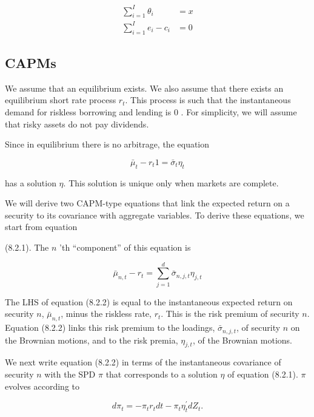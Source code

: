 \documentclass[\topdir/lecture\_notes.tex]{subfiles}
\begin{document}
\begin{equation}
\begin{aligned}
\sum_{i=1}^{I} \theta_{i} & =x \\
\sum_{i=1}^{I} e_{i}-c_{i} & =0
\end{aligned}
\end{equation}

\subsection{CAPMs}
We assume that an equilibrium exists. We also assume that there exists an equilibrium short rate process $r_{t}$. This process is such that the instantaneous demand for riskless borrowing and lending is 0 . For simplicity, we will assume that risky assets do not pay dividends.

Since in equilibrium there is no arbitrage, the equation

\begin{equation}
\bar{\mu}_{t}-r_{t} 1=\bar{\sigma}_{t} \eta_{t} \label{eq:8.2.1}
\end{equation}

has a solution $\eta$. This solution is unique only when markets are complete.

We will derive two CAPM-type equations that link the expected return on a security to its covariance with aggregate variables. To derive these equations, we start from equation

(8.2.1). The $n$ 'th ``component'' of this equation is

\begin{equation}
\bar{\mu}_{n, t}-r_{t}=\sum_{j=1}^{d} \bar{\sigma}_{n, j, t} \eta_{j, t} \label{eq:8.2.2}
\end{equation}

The LHS of equation (8.2.2) is equal to the instantaneous expected return on security $n$, $\bar{\mu}_{n, t}$, minus the riskless rate, $r_{t}$. This is the risk premium of security $n$. Equation (8.2.2) links this risk premium to the loadings, $\bar{\sigma}_{n, j, t}$, of security $n$ on the Brownian motions, and to the risk premia, $\eta_{j, t}$, of the Brownian motions.

We next write equation (8.2.2) in terms of the instantaneous covariance of security $n$ with the SPD $\pi$ that corresponds to a solution $\eta$ of equation (8.2.1). $\pi$ evolves according to

\begin{equation}
d \pi_{t}=-\pi_{t} r_{t} d t-\pi_{t} \eta_{t}^{\prime} d Z_{t} .
\end{equation}
\end{document}
